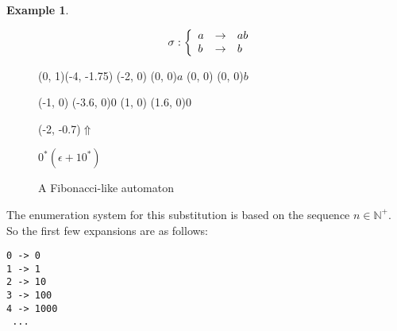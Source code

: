 \documentclass{article}
\newcommand{\spaces}{\begin{picture}(9,0)(0,0)\end{picture}}
\theoremstyle{definition}
\newtheorem{example}[theorem]{Example}
\begin{document}
\begin{example}
\begin{figure}[p]
\begin{eqnarray*}
\spaces
\sigma: \left\{ \begin{array}{lll}
a &\rightarrow& ab\\
b &\rightarrow& b
\end{array} \right.
\end{eqnarray*}
\begin{graph}(0, 1)(-4, -1.75)
  (-2, 0) (0, 0){$a$}
  (0, 0)  (0, 0){$b$}

  (-1, 0) \freetext(-3.6, 0){0}
   
  (1, 0) \freetext(1.6, 0){0}

  \freetext(-2, -0.7){$\Uparrow$}
\end{graph} $0^* (\epsilon + 10^*)$
\caption{A Fibonacci-like automaton}
\label{fig:fibonacci_brother}
\end{figure}

The enumeration system for this substitution is based on the sequence 
$n \in \mathbb{N}^+$. So the first few expansions are as follows:
\begin{verbatim}
0 -> 0
1 -> 1
2 -> 10
3 -> 100
4 -> 1000
 ...
\end{verbatim}
\end{example}
\end{document}
